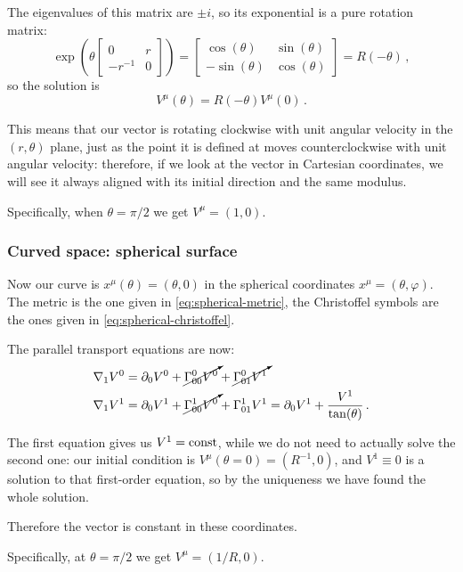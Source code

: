 \documentclass[main.tex]{subfiles}
\begin{document}
The eigenvalues of this matrix are \(\pm i\), so its exponential is a pure rotation matrix: 
%
\begin{equation}
  \exp(\theta \left[\begin{array}{cc}
  0 & r \\ 
  -r^{-1} & 0
  \end{array}\right]) =
  \left[\begin{array}{cc}
  \cos(\theta )  & \sin(\theta )  \\ 
  -\sin(\theta )  & \cos(\theta ) 
  \end{array}\right] = R(-\theta )
\,,
\end{equation}
%
so the solution is 
%
\begin{equation}
  V^{\mu }(\theta ) = R(-\theta )V^{\mu }(0)
\,.
\end{equation}

This means that our vector is rotating clockwise with unit angular velocity in the \((r, \theta )\) plane, just as the point it is defined at moves counterclockwise with unit angular velocity: therefore, if we look at the vector in Cartesian coordinates, we will see it always aligned with its initial direction and the same modulus.

Specifically, when \(\theta = \pi /2\) we get \(V^{\mu }=(1, 0)\).

\subsubsection{Curved space: spherical surface}

Now our curve is \(x^{\mu } (\theta ) = (\theta , 0)\) in the spherical coordinates \(x^{\mu } = (\theta, \varphi )\). The metric is the one given in \eqref{eq:spherical-metric}, the Christoffel symbols are the ones given in \eqref{eq:spherical-christoffel}.

The parallel transport equations are now: 
%
\begin{subequations}
\begin{align}
  \nabla_{1}V^{0} &= \partial_0 V^{0} + \cancelto{}{\Gamma^{0}_{00}V^{0}} + \cancelto{}{\Gamma^{0}_{01}V^{1} }  \\
  \nabla_{1}V^{1} &= \partial_0 V^{1} + \cancelto{}{\Gamma^{1}_{00}V^{0}} + \Gamma^{1}_{01}V^{1}
  = \partial_0 V^{1} + \frac{V^{1}}{\tan(\theta )}
\,.
\end{align}
\end{subequations}

The first equation gives us \(V^{1} = \text{const}\), while we do not need to actually solve the second one: our initial condition is \(V^{\mu}(\theta = 0) = (R^{-1}, 0)\), and \(V^{1} \equiv 0\) is a solution to that first-order equation, so by the uniqueness we have found the whole solution.

Therefore the vector is constant in these coordinates.

Specifically, at \(\theta = \pi /2\) we get \(V^{\mu } = (1/R, 0)\).
\end{document}
